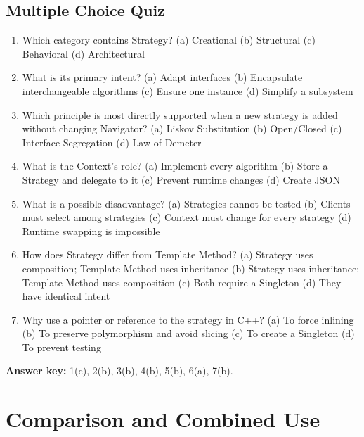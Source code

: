 \documentclass[11pt,a4paper]{report}
\begin{document}
\section{Multiple Choice Quiz}
\begin{enumerate}
  \item Which category contains Strategy?\quad
  (a) Creational \quad (b) Structural \quad (c) Behavioral \quad (d) Architectural
  \item What is its primary intent?\quad
  (a) Adapt interfaces \quad (b) Encapsulate interchangeable algorithms \quad
  (c) Ensure one instance \quad (d) Simplify a subsystem
  \item Which principle is most directly supported when a new strategy is added
  without changing Navigator?\quad
  (a) Liskov Substitution \quad (b) Open/Closed \quad
  (c) Interface Segregation \quad (d) Law of Demeter
  \item What is the Context's role?\quad
  (a) Implement every algorithm \quad (b) Store a Strategy and delegate to it \quad
  (c) Prevent runtime changes \quad (d) Create JSON
  \item What is a possible disadvantage?\quad
  (a) Strategies cannot be tested \quad (b) Clients must select among strategies \quad
  (c) Context must change for every strategy \quad (d) Runtime swapping is impossible
  \item How does Strategy differ from Template Method?\quad
  (a) Strategy uses composition; Template Method uses inheritance \quad
  (b) Strategy uses inheritance; Template Method uses composition \quad
  (c) Both require a Singleton \quad (d) They have identical intent
  \item Why use a pointer or reference to the strategy in C++?\quad
  (a) To force inlining \quad (b) To preserve polymorphism and avoid slicing \quad
  (c) To create a Singleton \quad (d) To prevent testing
\end{enumerate}
\textbf{Answer key:} 1(c), 2(b), 3(b), 4(b), 5(b), 6(a), 7(b).

\chapter{Comparison and Combined Use}
\end{document}

